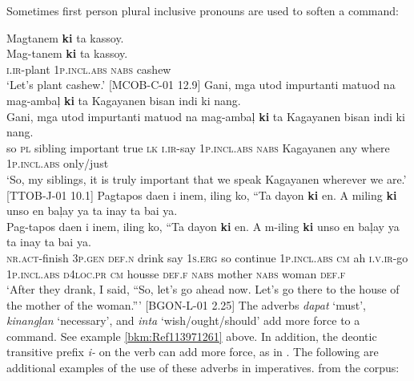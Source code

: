 Sometimes first person plural inclusive pronouns are used to soften a command:

\ea 
Magtanem  \textbf{ki}  ta  kassoy. \\\smallskip
\gll Mag-tanem  \textbf{ki}  ta  kassoy. \\
\textsc{i.ir}-plant  1\textsc{p.incl.abs}  \textsc{nabs}  cashew \\
\glt ‘Let’s plant cashew.’ [MCOB-C-01 12.9]
\z
\ea
Gani,  mga  utod  impurtanti  matuod  na  mag-ambaļ  \textbf{ki}  ta  Kagayanen bisan  indi  ki  nang. \\\smallskip
\gll Gani,  mga  utod  impurtanti  matuod  na  mag-ambaļ  \textbf{ki}  ta  Kagayanen bisan  indi  ki  nang. \\
so  \textsc{pl}  sibling  important  true  \textsc{lk}  \textsc{i.ir}-say  1\textsc{p.incl.abs}  \textsc{nabs}  Kagayanen
any  where  1\textsc{p.incl.abs}  only/just \\
\glt `So, my siblings, it is truly important that we speak Kagayanen wherever we are.’ [TTOB-J-01 10.1]
\z
\ea 
Pagtapos  daen  i  inem,  iling  ko,  “Ta  dayon  \textbf{ki}  en. A  miling  \textbf{ki}  unso  en  baļay  ya  ta  inay  ta  bai  ya. \\\smallskip
\gll Pag-tapos  daen  i  inem,  iling  ko,  “Ta  dayon  \textbf{ki}  en. A  m-iling  \textbf{ki}  unso  en  baļay  ya  ta  inay  ta  bai  ya. \\
\textsc{nr.act}-finish  3\textsc{p.gen}  \textsc{def.n}  drink  say  1\textsc{s.erg}  so  continue  1\textsc{p.incl.abs}  \textsc{cm}
ah  \textsc{i.v.ir}-go  1\textsc{p.incl.abs}  \textsc{d}4\textsc{loc.pr}  \textsc{cm}  housse  \textsc{def.f}  \textsc{nabs}  mother  \textsc{nabs}  woman  \textsc{def.f} \\
\glt `After they drank, I said, “So, let’s go ahead now. Let’s go there to the house of the mother of the woman.”' [BGON-L-01 2.25]
\z
The adverbs \textit{dapat} ‘must’, \textit{kinangļan} ‘necessary’, and \textit{inta} ‘wish/ought/should’ add more force to a command. See example \ref{bkm:Ref113971261} above. In addition, the deontic transitive prefix \textit{i-} on the verb can add more force, as in . The following are additional examples of the use of these adverbs in imperatives. from the corpus:


